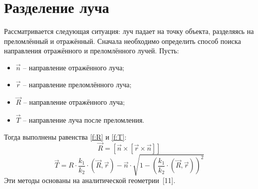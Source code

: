 \section{Разделение луча} {
    Рассматривается следующая ситуация: луч падает на точку объекта,
    разделяясь на преломлённый и отражённый.
    Сначала необходимо определить способ поиска
    направления отражённого и преломлённого лучей.
    Пусть:
    \begin{itemize}
        \item $\vec{n}$ -- направление отражённого луча;
        \item $\vec{r}$ -- направление преломлённого луча;
        \item $\vec{R}$ -- направление отражённого луча;
        \item $\vec{T}$ -- направление луча после преломления.
    \end{itemize}
    Тогда выполнены равенства \ref{f:R} и \ref{f:T}:
    \begin{equation}
        \label{f:R}
        \vec{R} = [\vec{n} \times [\vec{r} \times \vec{n}]]
    \end{equation}
    \begin{equation}
        \label{f:T}
        \vec{T} = R \cdot \frac{k_1}{k_2}
        \cdot (\vec{R}, \vec{r}) - \vec{n} \cdot
        \sqrt{ 1 - (\frac{k_1}{k_2} \cdot (\vec{R}, \vec{r}))^2 }
    \end{equation}
    Эти методы основаны на аналитической геометрии~[11].
    
}
